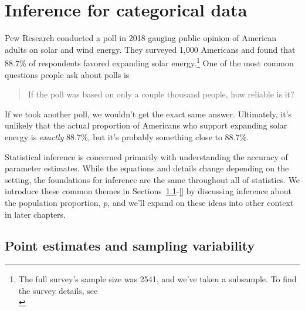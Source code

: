 
\chapter{Inference for categorical data}
\label{inferenceForCategoricalData}

\newcommand{\pewsolarpollsize}{1000}
\newcommand{\pewsolarpollprop}{0.887}
\newcommand{\pewsolarpollpropcomplement}{0.113}
\newcommand{\pewsolarpollpercent}{88.7}
\newcommand{\pewsolarpollpercentcomplement}{11.3}
\newcommand{\pewsolarpollcount}{887}
\newcommand{\pewsolarpollcountcomplement}{113}
\newcommand{\pewsolarpollse}{0.0100}

Pew Research conducted a poll in 2018 gauging public opinion of
American adults on solar and wind energy. They surveyed 1,000
Americans and found that \pewsolarpollpercent{}\% of respondents
favored expanding
solar energy.\footnote{The full survey's sample size was 2541,
and we've taken a subsample. To find the survey details, see\\
}
One of the most common questions people ask about polls is
\begin{quote}
If the poll was based on only a couple thousand people, how reliable is it?
\end{quote}
If we took another poll, we wouldn't get the exact same answer.
Ultimately, it's unlikely that the actual proportion of Americans
who support expanding solar energy is \emph{exactly}
\pewsolarpollpercent{}\%, but it's probably something close to
\pewsolarpollpercent{}\%.

Statistical inference is concerned primarily with understanding the
accuracy of parameter estimates. While the equations and details change
depending on the setting, the foundations for inference are the same
throughout all of statistics. We introduce these common themes in
Sections~\ref{pointEstimates}-\ref{} by discussing inference about the
population proportion, $p$, and we'll expand on these ideas into other
context in later chapters.


\section[Point estimates and sampling variability]{Point
    estimates and sampling variability} %
\label{pointEstimates}


